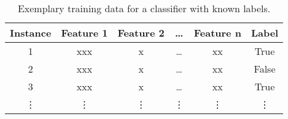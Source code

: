 \begin{table}[h!]
    \small
    \centering
    \begin{tabular}{@{}cccccc@{}}
        \toprule
        \textbf{Instance} & \textbf{Feature 1} & \textbf{Feature 2} & \dots  & \textbf{Feature n} & \textbf{Label} \\
        \midrule
        1                 & xxx                & x                  & \dots  & xx                 & True           \\
        2                 & xxx                & x                  & \dots  & xx                 & False          \\
        3                 & xxx                & x                  & \dots  & xx                 & True           \\
        \vdots            & \vdots             & \vdots             & \vdots & \vdots             & \vdots         \\
        \bottomrule
    \end{tabular}
    \caption[Exemplary training data for a classifier with known labels.]{Exemplary training data for a classifier with known labels. \footnotemark}
    \label{tab:classifier_label_data}
\end{table}
